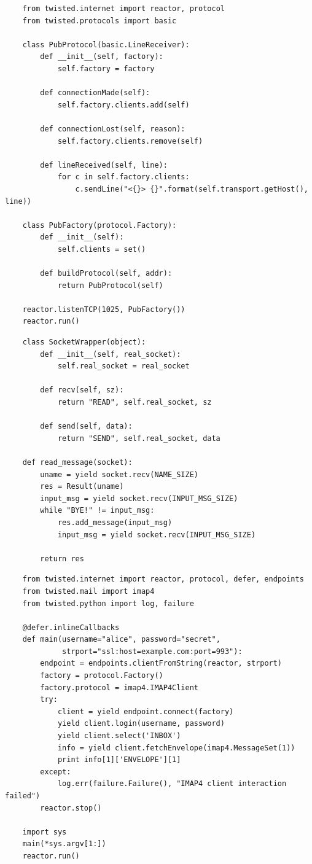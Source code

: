 \documentclass{article}
\begin{document}
{
\Large \vspace{15pt}
\begin{lstlisting}
	from twisted.internet import reactor, protocol
	from twisted.protocols import basic

	class PubProtocol(basic.LineReceiver):
	    def __init__(self, factory):
	        self.factory = factory

	    def connectionMade(self):
	        self.factory.clients.add(self)

	    def connectionLost(self, reason):
	        self.factory.clients.remove(self)

	    def lineReceived(self, line):
	        for c in self.factory.clients:
	            c.sendLine("<{}> {}".format(self.transport.getHost(), line))

	class PubFactory(protocol.Factory):
	    def __init__(self):
	        self.clients = set()

	    def buildProtocol(self, addr):
	        return PubProtocol(self)

	reactor.listenTCP(1025, PubFactory())
	reactor.run()
\end{lstlisting}
}	
\newpage
{
\Large \vspace{15pt}
\begin{lstlisting}
	class SocketWrapper(object):
		def __init__(self, real_socket):
			self.real_socket = real_socket

		def recv(self, sz):
			return "READ", self.real_socket, sz

		def send(self, data):
			return "SEND", self.real_socket, data

	def read_message(socket):
		uname = yield socket.recv(NAME_SIZE)
		res = Result(uname)
		input_msg = yield socket.recv(INPUT_MSG_SIZE)
		while "BYE!" != input_msg:
			res.add_message(input_msg)
			input_msg = yield socket.recv(INPUT_MSG_SIZE)

		return res
\end{lstlisting}
}	
\newpage
{
\Large \vspace{15pt}
\begin{lstlisting}
	from twisted.internet import reactor, protocol, defer, endpoints
	from twisted.mail import imap4
	from twisted.python import log, failure

	@defer.inlineCallbacks
	def main(username="alice", password="secret",
	         strport="ssl:host=example.com:port=993"):
	    endpoint = endpoints.clientFromString(reactor, strport)
	    factory = protocol.Factory()
	    factory.protocol = imap4.IMAP4Client
	    try:
	        client = yield endpoint.connect(factory)
	        yield client.login(username, password)
	        yield client.select('INBOX')
	        info = yield client.fetchEnvelope(imap4.MessageSet(1))
	        print info[1]['ENVELOPE'][1]
	    except:
	        log.err(failure.Failure(), "IMAP4 client interaction failed")
	    reactor.stop()

	import sys
	main(*sys.argv[1:])
	reactor.run()
\end{lstlisting}
}	
\newpage
\end{document}
